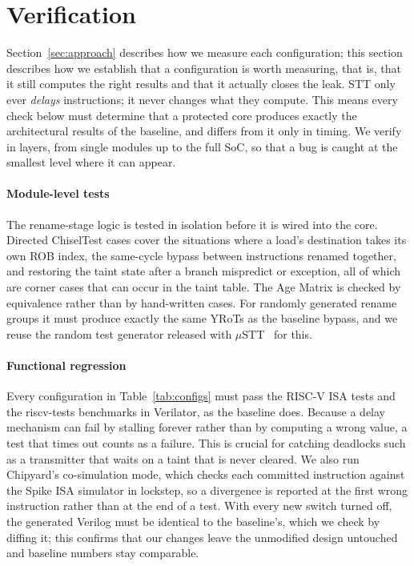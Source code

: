 \section{Verification}
\label{sec:verification}


Section~\ref{sec:approach} describes how we measure each configuration; this
section describes how we establish that a configuration is worth measuring,
that is, that it still computes the right results and that it actually closes
the leak. STT only ever \emph{delays} instructions; it never changes what they
compute. This means every check below must determine that a protected core
produces exactly the architectural results of the baseline, and differs
from it only in timing. We verify in layers, from single modules up to the
full SoC, so that a bug is caught at the smallest level where it can appear.

\paragraph{Module-level tests}
The rename-stage logic is tested in isolation before it is wired into the core.
Directed ChiselTest cases cover the situations where a load's
destination takes its own ROB index, the same-cycle bypass between
instructions renamed together, and restoring the taint state after a branch
mispredict or exception, all of which are corner cases that can occur in the taint table.
The Age Matrix is checked by equivalence rather than by hand-written cases. 
For randomly generated rename groups it must produce exactly the same YRoTs as the 
baseline bypass, and we reuse the random test generator released with 
$\mu$STT~\cite{Chen:uSTT:2025} for this.

\paragraph{Functional regression}
Every configuration in Table~\ref{tab:configs} must pass the RISC-V ISA tests
and the riscv-tests benchmarks in Verilator, as the baseline does. Because a
delay mechanism can fail by stalling forever rather than by computing a wrong
value, a test that times out counts as a failure. This is crucial for catching
deadlocks such as a transmitter that waits on a taint that is never cleared. 
We also run Chipyard's co-simulation mode, which checks each committed instruction
against the Spike ISA simulator in lockstep, so a divergence is reported at
the first wrong instruction rather than at the end of a test. With every new
switch turned off, the generated Verilog must be identical to the baseline's,
which we check by diffing it; this confirms that our changes leave the
unmodified design untouched and baseline numbers stay comparable.

